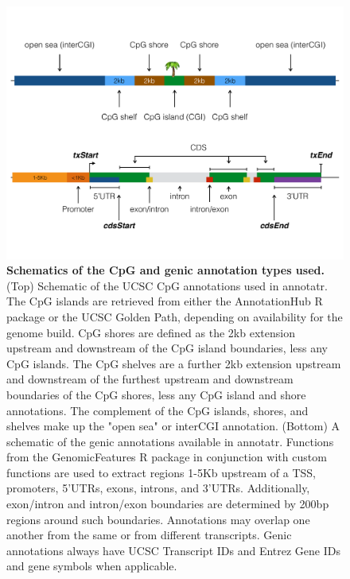 \begin{figure}[ht!]
\centering
\includegraphics[width=1\textwidth]{chap4figs/figure4_1.pdf}
\caption[Schematics of the CpG and genic annotation types used.]
{
\textbf{Schematics of the CpG and genic annotation types used.} (Top) Schematic of the UCSC CpG annotations used in annotatr. The CpG islands are retrieved from either the AnnotationHub R package or the UCSC Golden Path, depending on availability for the genome build. CpG shores are defined as the 2kb extension upstream and downstream of the CpG island boundaries, less any CpG islands. The CpG shelves are a further 2kb extension upstream and downstream of the furthest upstream and downstream boundaries of the CpG shores, less any CpG island and shore annotations. The complement of the CpG islands, shores, and shelves make up the "open sea" or interCGI annotation. (Bottom) A schematic of the genic annotations available in annotatr. Functions from the GenomicFeatures R package in conjunction with custom functions are used to extract regions 1-5Kb upstream of a TSS, promoters, 5'UTRs, exons, introns, and 3'UTRs. Additionally, exon/intron and intron/exon boundaries are determined by 200bp regions around such boundaries. Annotations may overlap one another from the same or from different transcripts. Genic annotations always have UCSC Transcript IDs and Entrez Gene IDs and gene symbols when applicable.
}
\label{chap4:fig:1}
\end{figure}

